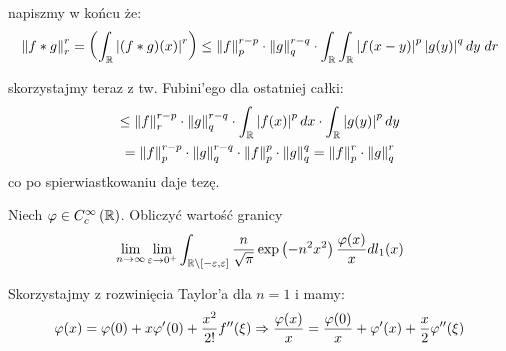 \documentclass[11pt]{scrartcl}
\begin{document}
    napiszmy w końcu że:
    \begin{gather*}
        \left\lVert f * g \right\rVert^r_r = \left ( \int_{\mathbb R} \left\lvert (f * g)(x) \right\rvert^r  \right ) \leq
        \left\lVert f \right\rVert^{r-p}_p \cdot \left\lVert g \right\rVert^{r-q}_q \cdot
        \int_{\mathbb R} \int_{\mathbb R} \left\lvert f(x-y) \right\rvert^p \left\lvert g(y) \right\rvert^q dy \; dr 
    \end{gather*}

    skorzystajmy teraz z tw. Fubini'ego dla ostatniej całki:
    \begin{gather*}
        \leq \left\lVert f \right\rVert^{r-p}_r \cdot \left\lVert g \right\rVert^{r-q}_q \cdot 
        \int_{\mathbb R} \left\lvert f(x) \right\rvert^p dx \cdot   
        \int_{\mathbb R} \left\lvert g(y) \right\rvert^p dy \\
        = \left\lVert f \right\rVert^{r-p}_p \cdot \left\lVert g \right\rVert^{r-q}_q \cdot \left\lVert f \right\rVert^{p}_p \cdot \left\lVert g \right\rVert^q_q 
        = \left\lVert f \right\rVert^r_p \cdot \left\lVert g \right\rVert^r_q
    \end{gather*}
    co po spierwiastkowaniu daje tezę.
    
    \begin{zadanie*}
        Niech $\varphi \in C^{\infty}_c \left ( \mathbb R \right )$. Obliczyć wartość granicy
        \[
            \lim_{n \to \infty } \lim_{\varepsilon \to 0^+} 
                \int_{\mathbb R \backslash [- \varepsilon , \varepsilon]}
                \frac{n}{\sqrt{\pi } } \exp \left ( -n^2 x^2 \right ) \frac{\varphi (x)}{x} dl_1 (x)
        \]
    \end{zadanie*}

    Skorzystajmy z rozwinięcia Taylor'a dla $n = 1$ i mamy:
    \[
        \varphi (x) = \varphi (0) + x \varphi' (0) + \frac{x^2}{2!} f''(\xi)
        \Rightarrow \frac{\varphi (x)}{x} = \frac{\varphi (0)}{x} + \varphi' (x) + \frac{x}{2} \varphi'' (\xi)
    \]
\end{document}
